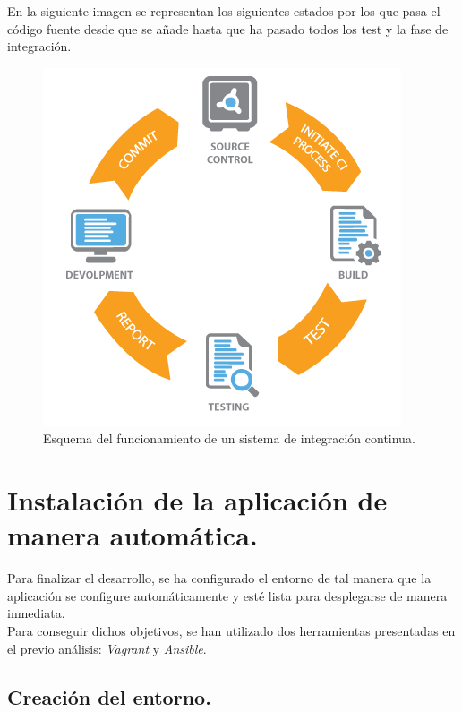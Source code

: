 En la siguiente imagen se representan los siguientes estados por los que pasa el código fuente desde que se añade hasta que ha pasado todos los test y la fase de integración.

\begin{figure}[H]
	\centering
	\includegraphics[scale=0.6]{imagenes/continuous-integration.png}
	\caption{Esquema del funcionamiento de un sistema de integración continua.\cite{image-ci} \label{fig:figura14}}
\end{figure}

\section{Instalación de la aplicación de manera automática.}
Para finalizar el desarrollo, se ha configurado el entorno de tal manera que la aplicación se configure automáticamente y esté lista para desplegarse de manera inmediata.\\

Para conseguir dichos objetivos, se han utilizado dos herramientas presentadas en el previo análisis: \textit{Vagrant} y \textit{Ansible}. 

\subsection{Creación del entorno.}

